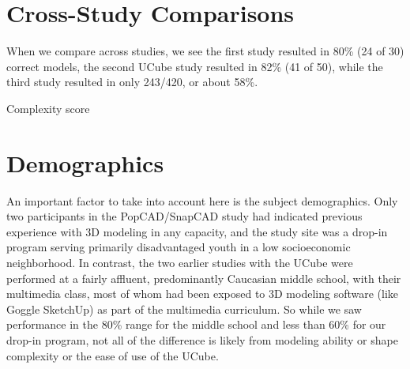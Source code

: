 \section{Cross-Study Comparisons}
When we compare across studies, we see the first study resulted in 80\% (24 of
30) correct models, the second UCube study resulted in 82\% (41 of 50), while
the third study resulted in only 243/420, or about 58\%.

Complexity score


\section{Demographics}

An important factor to take into account here is the subject demographics. Only
two participants in the PopCAD/SnapCAD study had indicated previous experience
with 3D modeling in any capacity, and the study site was a drop-in program
serving primarily disadvantaged youth in a low socioeconomic neighborhood. In
contrast, the two earlier studies with the UCube were performed at a fairly
affluent, predominantly Caucasian middle school, with their multimedia class,
most of whom had been exposed to 3D modeling software (like Goggle
SketchUp\cite{SketchUp}) as part of the multimedia curriculum. So while we saw
performance in the 80\% range for the middle school and less than 60\% for our
drop-in program, not all of the difference is likely from modeling ability or
shape complexity or the ease of use of the UCube.
